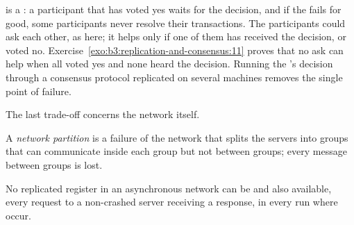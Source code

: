 \label{lst:b3:replication-and-consensus:twopc}

\label{out:b3:replication-and-consensus:twopc}

 is a : a participant that has voted yes waits for the decision, and if the  fails for good, some participants never resolve their transactions. %
The participants could ask each other, as here; it helps only if one of them has received the decision, or voted no. Exercise~\ref{exo:b3:replication-and-consensus:11} proves that no ask can help when all voted yes and none heard the decision. Running the 's decision through a consensus protocol replicated on several machines removes the single point of failure.

The last trade-off concerns the network itself.

\begin{definition}\label{def:b3:replication-and-consensus:cap}
A \emph{network partition} is a failure of the network that splits the servers into groups that can communicate inside each group but not between groups; every message between groups is lost.
\end{definition}

\begin{theorem}\label{thm:b3:replication-and-consensus:cap}
No replicated register in an asynchronous network can be  and also available, every request to a non-crashed server receiving a response, in every run where  occur.
\end{theorem}

